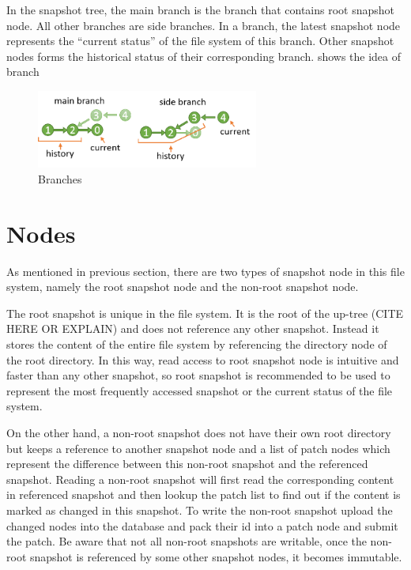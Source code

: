     In the snapshot tree, the main branch is the branch that contains root snapshot node. All other branches are side branches. In a branch, the latest snapshot node represents the “current status” of the file system of this branch. Other snapshot nodes forms the historical status of their corresponding branch.  shows the idea of branch

\begin{figure}[hbtp]
\centering
\includegraphics[width=0.65\textwidth]{Chapter-4/figs/fig22.png}
\caption{Branches}
\label{fig:branches}
\end{figure}

\section{Nodes}

    As mentioned in previous section, there are two types of snapshot node in this file system, namely the root snapshot node and the non-root snapshot node.

    The root snapshot is unique in the file system. It is the root of the up-tree (CITE HERE OR EXPLAIN) and does not reference any other snapshot. Instead it stores the content of the entire file system by referencing the directory node of the root directory. In this way, read access to root snapshot node is intuitive and faster than any other snapshot, so root snapshot is recommended to be used to represent the most frequently accessed snapshot or the current status of the file system.

    On the other hand, a non-root snapshot does not have their own root directory but keeps a reference to another snapshot node and a list of patch nodes which represent the difference between this non-root snapshot and the referenced snapshot. Reading a non-root snapshot will first read the corresponding content in referenced snapshot and then lookup the patch list to find out if the content is marked as changed in this snapshot. To write the non-root snapshot upload the changed nodes into the database and pack their id into a patch node and submit the patch. Be aware that not all non-root snapshots are writable, once the non-root snapshot is referenced by some other snapshot nodes, it becomes immutable.

